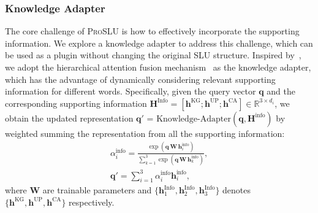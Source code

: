 \documentclass[letterpaper]{article} \usepackage{aaai22}  \usepackage{times}  \usepackage{helvet}  \usepackage{courier}  \usepackage[hyphens]{url}  \usepackage{graphicx} \urlstyle{rm} \def\UrlFont{\rm}  \usepackage{natbib}  \usepackage{caption} \DeclareCaptionStyle{ruled}{labelfont=normalfont,labelsep=colon,strut=off} \frenchspacing  \setlength{\pdfpagewidth}{8.5in}  \setlength{\pdfpageheight}{11in}  \usepackage{algorithm}
\begin{document}
\subsubsection{Knowledge Adapter}
The core challenge of \textsc{ProSLU} is how to effectively incorporate the supporting information.
We explore a knowledge adapter to address this challenge, which can be used as a plugin without changing the original SLU structure. 
Inspired by~\citet{Srinivasan2020MultimodalSR}, we adopt the hierarchical attention fusion mechanism~\citep{luong-etal-2015-effective, libovicky-helcl-2017-attention} as the knowledge adapter, which has the advantage of dynamically considering relevant supporting information for different words.
Specifically, given the query vector $\mathbf{q}$ and the corresponding supporting information $\mathbf{H}^{\text{Info}} = [\mathbf{h}^{\text{KG}};\mathbf{h}^{\text{UP}};\mathbf{h}^{\text{CA}}]\in \mathbb{R}^{3 \times d_i}$, we obtain the updated representation $ \mathbf{q}'$ = $\text{Knowledge-Adapter} (\mathbf{q}, \mathbf{H}^{\text{info}}) $ by weighted summing the representation from all the supporting information:
\begin{eqnarray}
    \alpha_{i}^{\text{info}} = \frac{\operatorname{exp}\left( \mathbf{q} \, \mathbf{W} \, \mathbf{h}^{\text{info}}_i \right)}{\sum_{k=1}^3 \operatorname{exp}\left( \mathbf{q} \, \mathbf{W} \, \mathbf{h}^{\text{info}}_k \right)}, \\
    	 \mathbf{q}' = \sum_{i=1}^3 \alpha_{i}^{\text{info}} \mathbf{h}^{\text{info}}_i,
    	  \label{eq:hierarchical1} 
 \label{eq:hierarchical2}
\end{eqnarray}
where $\mathbf{W}$ are trainable parameters and $\{\mathbf{h}_1^{\text{Info}}, \mathbf{h}_2^{\text{Info}}, \mathbf{h}_3^{\text{Info}}\}$ denotes $\{\mathbf{h}^{\text{KG}},\mathbf{h}^{\text{UP}},\mathbf{h}^{\text{CA}}\}$ respectively.
\end{document}
